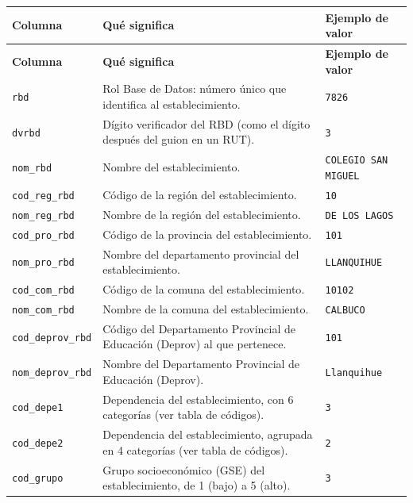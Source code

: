 \documentclass[10.5pt]{article}
\newcommand{\hdr}[1]{\textbf{\color{white}#1}}
\begin{document}
\begin{xltabular}{\linewidth}{@{}p{4.5cm} >{\raggedright\arraybackslash}X p{3.4cm}@{}}
\hdr{Columna} & \hdr{Qué significa} & \hdr{Ejemplo de valor} \\
\endfirsthead
{}\hdr{Columna} & \hdr{Qué significa} & \hdr{Ejemplo de valor} \\
\endhead
\texttt{rbd} & Rol Base de Datos: número único que identifica al establecimiento. & \texttt{7826} \\
\texttt{dvrbd} & Dígito verificador del RBD (como el dígito después del guion en un RUT). & \texttt{3} \\
\texttt{nom\_\allowbreak{}rbd} & Nombre del establecimiento. & \texttt{COLEGIO SAN MIGUEL} \\
\texttt{cod\_\allowbreak{}reg\_\allowbreak{}rbd} & Código de la región del establecimiento. & \texttt{10} \\
\texttt{nom\_\allowbreak{}reg\_\allowbreak{}rbd} & Nombre de la región del establecimiento. & \texttt{DE LOS LAGOS} \\
\texttt{cod\_\allowbreak{}pro\_\allowbreak{}rbd} & Código de la provincia del establecimiento. & \texttt{101} \\
\texttt{nom\_\allowbreak{}pro\_\allowbreak{}rbd} & Nombre del departamento provincial del establecimiento. & \texttt{LLANQUIHUE} \\
\texttt{cod\_\allowbreak{}com\_\allowbreak{}rbd} & Código de la comuna del establecimiento. & \texttt{10102} \\
\texttt{nom\_\allowbreak{}com\_\allowbreak{}rbd} & Nombre de la comuna del establecimiento. & \texttt{CALBUCO} \\
\texttt{cod\_\allowbreak{}deprov\_\allowbreak{}rbd} & Código del Departamento Provincial de Educación (Deprov) al que pertenece. & \texttt{101} \\
\texttt{nom\_\allowbreak{}deprov\_\allowbreak{}rbd} & Nombre del Departamento Provincial de Educación (Deprov). & \texttt{Llanquihue} \\
\texttt{cod\_\allowbreak{}depe1} & Dependencia del establecimiento, con 6 categorías (ver tabla de códigos). & \texttt{3} \\
\texttt{cod\_\allowbreak{}depe2} & Dependencia del establecimiento, agrupada en 4 categorías (ver tabla de códigos). & \texttt{2} \\
\texttt{cod\_\allowbreak{}grupo} & Grupo socioeconómico (GSE) del establecimiento, de 1 (bajo) a 5 (alto). & \texttt{3} \\

\end{xltabular}
\end{document}
